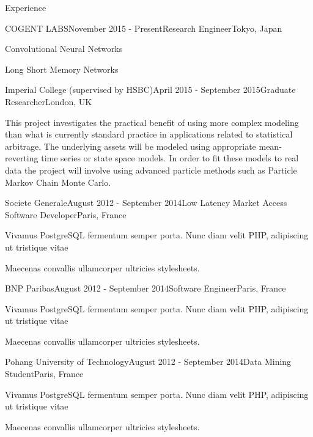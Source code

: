 \documentclass{resume} %
\begin{document}
\begin{rSection}{Experience}

\begin{rSubsection}{COGENT LABS}{November 2015 - Present}{Research Engineer}{Tokyo, Japan}
\item Convolutional Neural Networks
\item Long Short Memory Networks
\end{rSubsection}


\begin{rSubsection}{Imperial College (supervised by HSBC)}{April 2015 - September 2015}{Graduate Researcher}{London, UK}
\item This project investigates the practical benefit of using more complex modeling than what is currently standard practice in applications related to statistical arbitrage. The underlying assets will be modeled using appropriate mean-reverting time series or state space models. In order to fit these models to real data the project will involve using advanced particle methods such as Particle Markov Chain Monte Carlo.
\end{rSubsection}


\begin{rSubsection}{Societe Generale}{August 2012 - September 2014}{Low Latency Market Access Software Developer}{Paris, France}
\item Vivamus PostgreSQL fermentum semper porta. Nunc diam velit PHP, adipiscing ut tristique vitae
\item Maecenas convallis ullamcorper ultricies stylesheets.
\end{rSubsection}

\begin{rSubsection}{BNP Paribas}{August 2012 - September 2014}{Software Engineer}{Paris, France}
\item Vivamus PostgreSQL fermentum semper porta. Nunc diam velit PHP, adipiscing ut tristique vitae
\item Maecenas convallis ullamcorper ultricies stylesheets.
\end{rSubsection}

\begin{rSubsection}{Pohang University of Technology}{August 2012 - September 2014}{Data Mining Student}{Paris, France}
\item Vivamus PostgreSQL fermentum semper porta. Nunc diam velit PHP, adipiscing ut tristique vitae
\item Maecenas convallis ullamcorper ultricies stylesheets.
\end{rSubsection}

\end{rSection}
\end{document}
